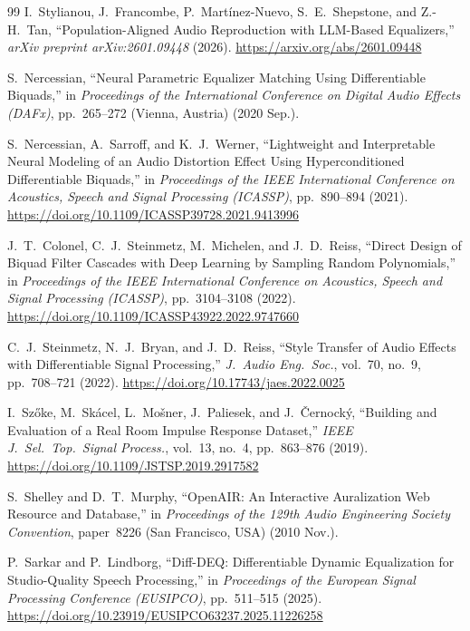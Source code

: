 \documentclass{aes2e}
\begin{document}
\begin{thebibliography}{99}
I.~Stylianou, J.~Francombe, P.~Mart\'inez-Nuevo, S.~E.~Shepstone,
and Z.-H.~Tan,
``Population-Aligned Audio Reproduction with LLM-Based Equalizers,''
\emph{arXiv preprint arXiv:2601.09448} (2026).
\url{https://arxiv.org/abs/2601.09448}

S.~Nercessian,
``Neural Parametric Equalizer Matching Using Differentiable Biquads,''
in \emph{Proceedings of the International Conference on Digital Audio Effects
(DAFx)}, pp.~265--272 (Vienna, Austria) (2020 Sep.).

S.~Nercessian, A.~Sarroff, and K.~J.~Werner,
``Lightweight and Interpretable Neural Modeling of an Audio Distortion
Effect Using Hyperconditioned Differentiable Biquads,''
in \emph{Proceedings of the IEEE International Conference on Acoustics,
Speech and Signal Processing (ICASSP)}, pp.~890--894 (2021).
\url{https://doi.org/10.1109/ICASSP39728.2021.9413996}

J.~T.~Colonel, C.~J.~Steinmetz, M.~Michelen, and J.~D.~Reiss,
``Direct Design of Biquad Filter Cascades with Deep Learning by Sampling
Random Polynomials,''
in \emph{Proceedings of the IEEE International Conference on Acoustics,
Speech and Signal Processing (ICASSP)}, pp.~3104--3108 (2022).
\url{https://doi.org/10.1109/ICASSP43922.2022.9747660}

C.~J.~Steinmetz, N.~J.~Bryan, and J.~D.~Reiss,
``Style Transfer of Audio Effects with Differentiable Signal Processing,''
\emph{J.\ Audio Eng.\ Soc.}, vol.~70, no.~9, pp.~708--721 (2022).
\url{https://doi.org/10.17743/jaes.2022.0025}

I.~Sz\H{o}ke, M.~Sk\'{a}cel, L.~Mo\v{s}ner, J.~Paliesek, and J.~\v{C}ernock\'{y},
``Building and Evaluation of a Real Room Impulse Response Dataset,''
\emph{IEEE J.\ Sel.\ Top.\ Signal Process.}, vol.~13, no.~4, pp.~863--876 (2019).
\url{https://doi.org/10.1109/JSTSP.2019.2917582}

S.~Shelley and D.~T.~Murphy,
``OpenAIR: An Interactive Auralization Web Resource and Database,''
in \emph{Proceedings of the 129th Audio Engineering Society Convention},
paper~8226 (San Francisco, USA) (2010 Nov.).

P.~Sarkar and P.~Lindborg,
``Diff-DEQ: Differentiable Dynamic Equalization for Studio-Quality Speech
Processing,''
in \emph{Proceedings of the European Signal Processing Conference (EUSIPCO)},
pp.~511--515 (2025).
\url{https://doi.org/10.23919/EUSIPCO63237.2025.11226258}


\end{thebibliography}
\end{document}
